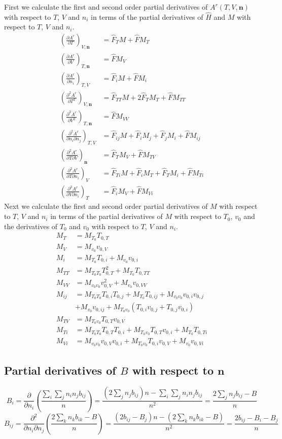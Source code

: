 \documentclass[english]{../thermomemo/thermomemo}
\newcommand{\mbn}[0]{\mathbf n}
\newcommand*{\pdersub}[3]{\left(\frac{\partial #1}{\partial #2}\right)_{#3}}
\newcommand*{\pddersub}[3]{\left(\frac{\partial^2 #1}{\partial #2^2}\right)_{#3}}
\newcommand*{\pdcrosssub}[4]{\left(\frac{\partial^2 #1}{\partial #2 \partial #3}\right)_{#4}}
\newcommand*{\hF}[0]{\hat F}
\newcommand*{\hH}[0]{\hat H}
\newcommand{\lp}{\left(}
\newcommand{\rp}{\right)}
\numberwithin{equation}{section}
\begin{document}
First we calculate the first and second order partial derivatives of
$A^r(T,V,\mbn)$ with respect to $T$, $V$ and $n_i$ in terms of the
partial derivatives of $\hH$ and $M$ with respect to $T$, $V$ and
$n_i$.
\begin{align}
  \pdersub{A^r}{T}{V,\mbn} &= \hF_TM+\hF M_T \\
  \pdersub{A^r}{V}{T,\mbn} &= \hF M_V \\
  \pdersub{A^r}{n_i}{T,V} &= \hF_iM + \hF M_i \\
  \pddersub{A^r}{T}{V,\mbn} &= \hF_{TT}M + 2\hF_TM_T + \hF M_{TT} \\
  \pddersub{A^r}{V}{T,\mbn} &= \hF M_{VV} \\
  \pdcrosssub{A^r}{n_i}{n_j}{T,V} &= \hF_{ij}M + \hF_i M_j + \hF_j M_i + \hF M_{ij} \\
  \pdcrosssub{A^r}{T}{V}{\mbn} &= \hF_TM_V+\hF M_{TV} \\
  \pdcrosssub{A^r}{T}{n_i}{V} &= \hF_{Ti}M + \hF_i M_T + \hF_T M_i + \hF M_{Ti} \\
  \pdcrosssub{A^r}{V}{n_i}{T} &= \hF_i M_V + \hF M_{Vi}
\end{align}
Next we calculate the first and second order partial derivatives of
$M$ with respect to $T$, $V$ and $n_i$ in terms of the partial
derivatives of $M$ with respect to $T_0$, $v_0$ and the derivatives of
$T_0$ and $v_0$ with respect to $T$, $V$ and $n_i$.
\begin{align} %
  M_T    &= M_{T_0}T_{0,T} \\
  M_V    &= M_{v_0}v_{0,V} \\
  M_i    &= M_{T_0}T_{0,i} + M_{v_0}v_{0,i} \\
  M_{TT}  &= M_{T_0T_0}T_{0,T}^2 + M_{T_0}T_{0,TT} \\
  M_{VV}  &= M_{v_0v_0}v_{0,V}^2 + M_{v_0}v_{0,VV} \\
  M_{ij}  &= M_{T_0T_0}T_{0,i}T_{0,j} + M_{T_0}T_{0,ij} + M_{v_0v_0}v_{0,i}v_{0,j} \\
  &+ M_{v_0}v_{0,ij} + M_{T_0v_0}(T_{0,i}v_{0,j}+T_{0,j}v_{0,i}) \\
  M_{TV}  &= M_{T_0v_0}T_{0,T}v_{0,V} \\
  M_{Ti}  &= M_{T_0T_0}T_{0,T}T_{0,i} + M_{T_0v_0} T_{0,T} v_{0,i} + M_{T_0}T_{0,Ti} \\
  M_{Vi} &= M_{v_0v_0}v_{0,V}v_{0,i} + M_{T_0v_0} T_{0,i} v_{0,V} +
  M_{v_0}v_{0,Vi}
\end{align}
\subsection*{Partial derivatives of $B$ with respect to $\mbn$}
$$
B_i = \frac{\partial}{\partial n_i} \lp \frac{\sum_i \sum_j n_i n_j
  b_{ij}}{n} \rp = \frac{\lp 2 \sum_j n_j b_{ij} \rp n - \sum_i \sum_j
  n_i n_j b_{ij}}{n^2} = \frac{2 \sum_j n_j b_{ij} -B}{n}
$$
$$
B_{ij} = \frac{\partial^2}{\partial n_i \partial n_j} \lp \frac{2
  \sum_k n_k b_{ik} -B}{n} \rp = \frac{\lp 2b_{ij}-B_j \rp n - \lp 2
  \sum_k n_k b_{ik} -B \rp}{n^2} = \frac{2b_{ij}-B_i-B_j}{n}
$$
\end{document}
